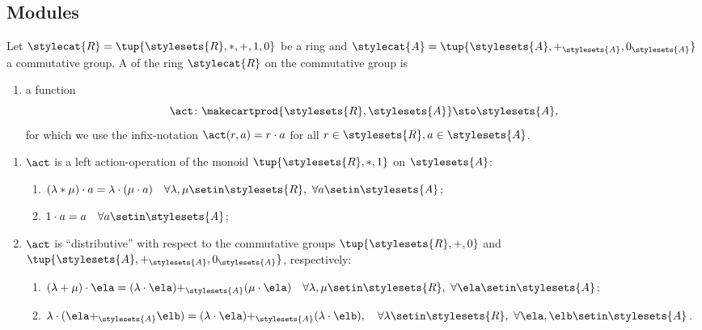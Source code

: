 {    \subsection{Modules}


\begin{ctdefinition}
    \label{def:left-ring-action-operation}
    Let $\stylecat{R} = \tup{\stylesets{R}, *, +, 1, 0}$  be a ring and $\stylecat{A} = \tup{\stylesets{A}, \mathbf{+}_{\stylesets{A}}, \text{0}_\stylesets{A} }$ a commutative group. 
    A  of the ring $\stylecat{R}$ on the commutative group  is 
    \begin{body}
        \constit
        \begin{enumerate}
            \item a function
            \begin{equation}
                  \label{eq:lact-ring}
                  \act \colon \makecartprod{\stylesets{R}, \stylesets{A}} \sto \stylesets{A},
              \end{equation}
              for which we use the infix-notation $\act(r, a) =  r \cdot a$ for all $r \in \stylesets{R}, a \in \stylesets{A}$. 
            \end{enumerate}
        \condit
        \begin{enumerate}
            \item $\act$ is a left action-operation of the monoid $\tup{\stylesets{R}, *, 1}$ on $\stylesets{A}$:
            \begin{enumerate}
                      \item $(\lambda * \mu) \cdot a = \lambda \cdot( \mu \cdot a) \quad \forall \lambda, \mu \setin \stylesets{R}, \ \forall a \setin \stylesets{A}$;
                      \item $1 \cdot a = a \quad \forall a \setin \stylesets{A}$;
            \end{enumerate}
            \item $\act$ is ``distributive'' with respect to the commutative groups $\tup{\stylesets{R}, +, 0}$ and $\tup{\stylesets{A}, \mathbf{+}_\stylesets{A}, \text{0}_\stylesets{A}}$,  respectively:
            \begin{enumerate}
                                        \item $(\lambda + \mu) \cdot \ela = (\lambda \cdot \ela) \mathbf{+}_\stylesets{A} (\mu \cdot \ela) \quad \forall \lambda, \mu \setin \stylesets{R}, \ \forall \ela \setin \stylesets{A}$;
                      \item $\lambda \cdot (\ela \mathbf{+}_\stylesets{A} \elb) = (\lambda \cdot \ela) \mathbf{+}_\stylesets{A} (\lambda \cdot \elb), \quad \forall \lambda \setin \stylesets{R}, \ \forall \ela, \elb \setin \stylesets{A}$.
                  \end{enumerate}
        \end{enumerate}
    \end{body}
\end{ctdefinition}



}

